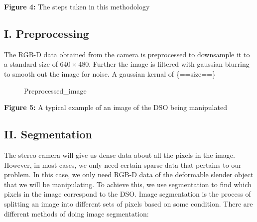 \textbf{Figure 4:} The steps taken in this methodology

\subsection{I. Preprocessing}\label{i.-preprocessing}

The RGB-D data obtained from the camera is preprocessed to downsample it
to a standard size of \(640\times 480\). Further the image is filtered
with gaussian blurring to smooth out the image for noise. A gaussian
kernal of \{==size==\}

\begin{figure}
\centering
{}
\caption{Preprocessed\_image}
\end{figure}

\textbf{Figure 5:} A typical example of an image of the DSO being
manipulated

\subsection{II. Segmentation}\label{ii.-segmentation}

The stereo camera will give us dense data about all the pixels in the
image. However, in most cases, we only need certain sparse data that
pertains to our problem. In this case, we only need RGB-D data of the
deformable slender object that we will be manipulating. To achieve this,
we use segmentation to find which pixels in the image correspond to the
DSO. Image segmentation is the process of splitting an image into
different sets of pixels based on some condition. There are different
methods of doing image segmentation:

